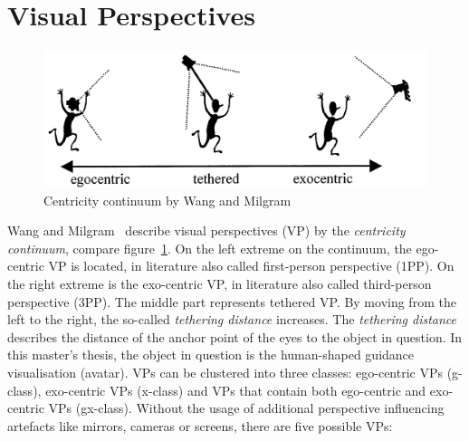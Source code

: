 \section{Visual Perspectives}
\label{section:visual_perspectives}
\begin{figure}[H]
	\centering
	\includegraphics[width=\textwidth]{figures/ego_exo_continuum.PNG}
	\caption[Centricity continuum by Wang et al.]{Centricity continuum by Wang and Milgram~\cite{centricitycontinuum}}
	\label{fig:ego-exo-continuum}
\end{figure}
Wang and Milgram~\cite{centricitycontinuum} describe visual perspectives (VP) by the \textit{centricity continuum}, compare figure~\ref{fig:ego-exo-continuum}. On the left extreme on the continuum, the ego-centric VP is located, in literature also called first-person perspective (1PP). On the right extreme is the exo-centric VP, in literature also called third-person perspective (3PP). The middle part represents tethered VP. By moving from the left to the right, the so-called \textit{tethering distance} increases. The \textit{tethering distance} describes the distance of the anchor point of the eyes to the object in question. In this master's thesis, the object in question is the human-shaped guidance visualisation (avatar). VPs can be clustered into three classes: ego-centric VPs (g-class), exo-centric VPs (x-class) and VPs that contain both ego-centric and exo-centric VPs (gx-class). Without the usage of additional perspective influencing artefacts like mirrors, cameras or screens, there are five possible VPs:
